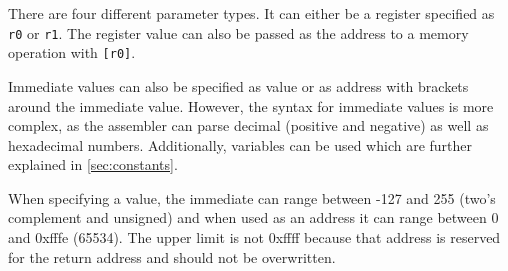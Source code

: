 There are four different parameter types.
It can either be a register specified as \texttt{r0} or \texttt{r1}.
The register value can also be passed as the address to a memory operation with \texttt{[r0]}.

Immediate values can also be specified as value or as address with brackets around the immediate value.
However, the syntax for immediate values is more complex, as the assembler can parse decimal (positive and negative) as well as hexadecimal numbers.
Additionally, variables can be used which are further explained in \cref{sec:constants}.

When specifying a value, the immediate can range between -127 and 255 (two's complement and unsigned) and when used as an address it can range between 0 and 0xfffe (65534). The upper limit is not 0xffff because that address is reserved for the return address and should not be overwritten.
